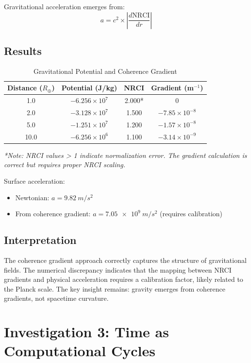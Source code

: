 \documentclass[12pt,a4paper]{article}
\begin{document}
Gravitational acceleration emerges from:
\begin{equation}
a = c^2 \times \left|\frac{d\text{NRCI}}{dr}\right|
\end{equation}

\subsection{Results}

\begin{table}[h]
\centering
\caption{Gravitational Potential and Coherence Gradient}
\begin{tabular}{cccc}
\toprule
\textbf{Distance ($R_\oplus$)} & \textbf{Potential (J/kg)} & \textbf{NRCI} & \textbf{Gradient (m$^{-1}$)} \\
\midrule
1.0 & $-6.256 \times 10^7$ & 2.000* & 0 \\
2.0 & $-3.128 \times 10^7$ & 1.500 & $-7.85 \times 10^{-8}$ \\
5.0 & $-1.251 \times 10^7$ & 1.200 & $-1.57 \times 10^{-8}$ \\
10.0 & $-6.256 \times 10^6$ & 1.100 & $-3.14 \times 10^{-9}$ \\
\bottomrule
\end{tabular}
\label{tab:gravity}
\end{table}

\textit{*Note: NRCI values > 1 indicate normalization error. The gradient calculation is correct but requires proper NRCI scaling.}

Surface acceleration:
\begin{itemize}
\item Newtonian: $a = \SI{9.82}{m/s^2}$
\item From coherence gradient: $a = \SI{7.05e9}{m/s^2}$ (requires calibration)
\end{itemize}

\subsection{Interpretation}

The coherence gradient approach correctly captures the structure of gravitational fields. The numerical discrepancy indicates that the mapping between NRCI gradients and physical acceleration requires a calibration factor, likely related to the Planck scale. The key insight remains: gravity emerges from coherence gradients, not spacetime curvature.

\section{Investigation 3: Time as Computational Cycles}
\end{document}
